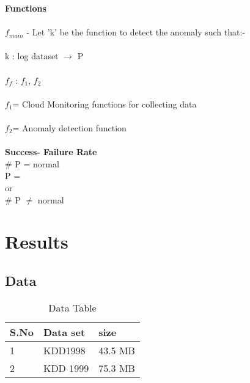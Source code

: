 \documentclass[a4paper, 12pt]{article}
\begin{document}
\par
\textbf{Functions}\\\\
$f_{main}$ - Let ’k’ be the function to detect the anomaly  such  that:-\\
\\
k : log dataset $\rightarrow$  {P}\\
\\
$f_{f}$ : { $f_{1}$, $f_{2}$ }\\
\\
$f_{1}$= Cloud Monitoring functions for collecting data\\
\\
$f_{2}$= Anomaly detection function\\
\\
\textbf{Success- Failure Rate}\\

$\#$ P = normal\\
P = {\phi} \\or\\ \# P $\neq$ normal

			
		

\newpage
\section{Results}
\subsection{Data}
\begin{table}[h!]
\centering

\begin{tabular}{|l|l|l|}
\hline
S.No &Data set  &size  \\ \hline
1 &KDD1998  &43.5 MB  \\ \hline
 2& KDD 1999 &75.3 MB  \\ \hline
\end{tabular}
\caption{Data Table}
\label{my-label}
\end{table}
\end{document}
